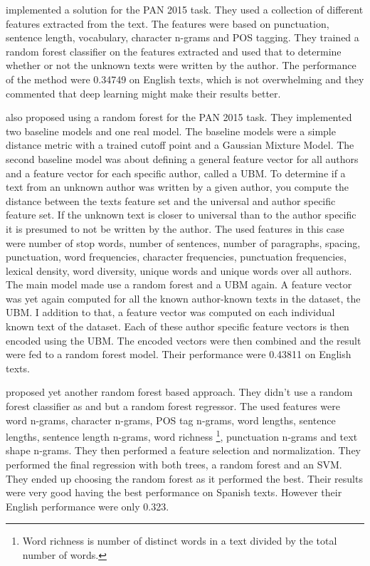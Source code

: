 \cite{maitra2015} implemented a solution for the PAN 2015 task. They used a
collection of different features extracted from the text. The features were
based on punctuation, sentence length, vocabulary, character n-grams and
\gls{POS} tagging. They trained a random forest classifier on the features
extracted and used that to determine whether or not the unknown texts were
written by the author. The performance of the method were 0.34749 on English
texts, which is not overwhelming and they commented that deep learning might
make their results better.

\cite{pacheco2015} also proposed using a random forest for the PAN 2015 task.
They implemented two baseline models and one real model. The baseline models
were a simple distance metric with a trained cutoff point and a Gaussian Mixture
Model. The second baseline model was about defining a general feature vector for
all authors and a feature vector for each specific author, called a \gls{UBM}.
To determine if a text from an unknown author was written by a given author,
you compute the distance between the texts feature set and the universal and
author specific feature set. If the unknown text is closer to universal than to
the author specific it is presumed to not be written by the author. The used
features in this case were number of stop words, number of sentences, number
of paragraphs, spacing, punctuation, word frequencies, character frequencies,
punctuation frequencies, lexical density, word diversity, unique words and
unique words over all authors. The main model made use a random forest and a
\gls{UBM} again. A feature vector was yet again computed for all the known
author-known texts in the dataset, the \gls{UBM}. I addition to that, a feature
vector was computed on each individual known text of the dataset. Each of these
author specific feature vectors is then encoded using the \gls{UBM}. The encoded
vectors were then combined and the result were fed to a random forest model.
Their performance were 0.43811 on English texts.

\cite{bartoli2015b} proposed yet another random forest based approach.
They didn't use a random forest classifier as \cite{maitra2015} and
\cite{pacheco2015} but a random forest regressor. The used features were word
n-grams, character n-grams, \gls{POS} tag n-grams, word lengths, sentence
lengths, sentence length n-grams, word richness \footnote{Word richness is
number of distinct words in a text divided by the total number of words.},
punctuation n-grams and text shape n-grams. They then performed a feature
selection and normalization. They performed the final regression with both
trees, a random forest and an SVM. They ended up choosing the random forest as
it performed the best. Their results were very good having the best performance
on Spanish texts. However their English performance were only 0.323.

